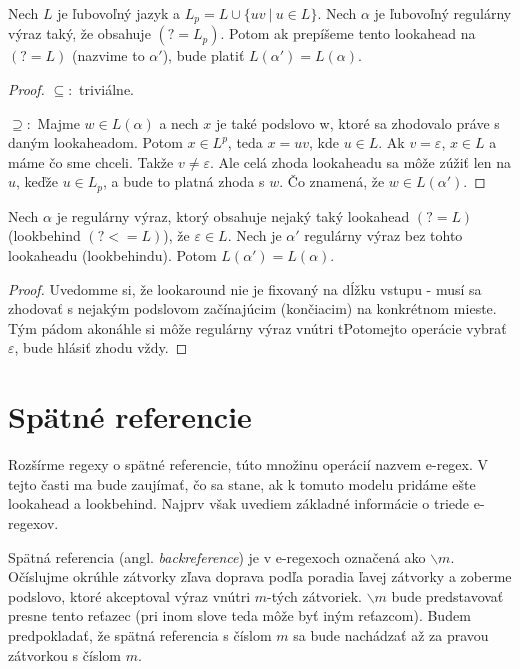 \begin{veta}
Nech $L$ je ľubovoľný jazyk a $L_p = L \cup \lbrace uv ~|~ u \in L \rbrace$. Nech $\alpha$ je ľubovoľný regulárny výraz taký, že obsahuje $(?=L_p)$. Potom ak prepíšeme tento lookahead na $(?=L)$ (nazvime to $\alpha '$), bude platiť $L(\alpha ') = L(\alpha )$.
\end{veta}
\begin{proof}
$\subseteq :$ triviálne.

$\supseteq :$ Majme $w \in L(\alpha)$ a nech $x$ je také podslovo w, ktoré sa zhodovalo práve s daným lookaheadom. Potom $x \in L^p$, teda $x=uv$, kde $u \in L$. Ak $v=\varepsilon$, $x \in L$ a máme čo sme chceli. Takže $v\neq \varepsilon$. Ale celá zhoda lookaheadu sa môže zúžiť len na $u$, keďže $u \in L_p$, a bude to platná zhoda s $w$. Čo znamená, že $w \in L(\alpha ')$.
\end{proof}

\begin{veta}
Nech $\alpha$ je regulárny výraz, ktorý obsahuje nejaký taký lookahead $(?=L)$ (lookbehind $(?<=L)$), že $\varepsilon \in L$. Nech je $\alpha '$ regulárny výraz bez tohto lookaheadu (lookbehindu). Potom $L(\alpha ') = L(\alpha)$.
\end{veta}
\begin{proof}
Uvedomme si, že lookaround nie je fixovaný na dĺžku vstupu - musí sa zhodovať s nejakým podslovom začínajúcim (končiacim) na konkrétnom mieste. Tým pádom akonáhle si môže regulárny výraz vnútri tPotomejto operácie vybrať $\varepsilon$, bude hlásiť zhodu vždy.
\end{proof}

\section{Spätné referencie}\label{chap:backref}

Rozšírme regexy o spätné referencie, túto množinu operácií nazvem e-regex. V tejto časti ma bude zaujímať, čo sa stane, ak k tomuto modelu pridáme ešte lookahead a lookbehind. Najprv však uvediem základné informácie o triede e-regexov.

Spätná referencia (angl. \textit{backreference}) je v e-regexoch označená ako $ \backslash m $. Očíslujme okrúhle zátvorky zľava doprava podľa poradia ľavej zátvorky a zoberme podslovo, ktoré akceptoval výraz vnútri $m$-tých zátvoriek. $ \backslash m $ bude predstavovať presne tento reťazec (pri inom slove teda môže byť iným reťazcom). Budem predpokladať, že spätná referencia s číslom $m$ sa bude nachádzať až za pravou zátvorkou s číslom $m$.

